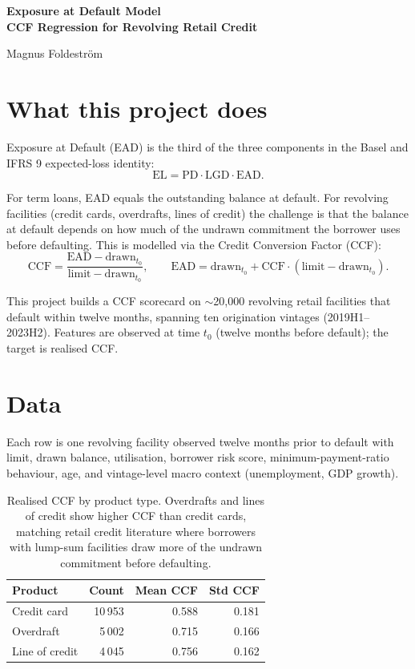 \documentclass[a4paper,11pt]{article}
\begin{document}
\begin{titlepage}
\thispagestyle{empty}
\centering
\vspace*{3cm}
{\Huge\bfseries Exposure at Default Model\\\bigskip
\LARGE CCF Regression for Revolving Retail Credit
\par}
\vspace{1.5cm}
{\Large Magnus Foldeström\par}
\vfill
\end{titlepage}

\section{What this project does}

Exposure at Default (EAD) is the third of the three components in the
Basel and IFRS 9 expected-loss identity:
$$\mathrm{EL} = \mathrm{PD} \cdot \mathrm{LGD} \cdot \mathrm{EAD}.$$

For term loans, EAD equals the outstanding balance at default. For
revolving facilities (credit cards, overdrafts, lines of credit) the
challenge is that the balance at default depends on how much of the
undrawn commitment the borrower uses before defaulting. This is
modelled via the Credit Conversion Factor (CCF):
$$\mathrm{CCF} = \frac{\mathrm{EAD} - \mathrm{drawn}_{t_0}}{\mathrm{limit} - \mathrm{drawn}_{t_0}},
\qquad
\mathrm{EAD} = \mathrm{drawn}_{t_0} + \mathrm{CCF} \cdot (\mathrm{limit} - \mathrm{drawn}_{t_0}).$$

This project builds a CCF scorecard on $\sim$20{,}000 revolving
retail facilities that default within twelve months, spanning ten
origination vintages (2019H1--2023H2). Features are observed at time
$t_0$ (twelve months before default); the target is realised CCF.

\section{Data}

Each row is one revolving facility observed twelve months prior to
default with limit, drawn balance, utilisation, borrower risk score,
minimum-payment-ratio behaviour, age, and vintage-level macro
context (unemployment, GDP growth).

\begin{table}[H]
\centering
\begin{tabular}{l r r r}
\toprule
\textbf{Product} & \textbf{Count} & \textbf{Mean CCF} & \textbf{Std CCF} \\
\midrule
Credit card     & 10\,953 & 0.588 & 0.181 \\
Overdraft       & 5\,002  & 0.715 & 0.166 \\
Line of credit  & 4\,045  & 0.756 & 0.162 \\
\bottomrule
\end{tabular}
\caption{Realised CCF by product type. Overdrafts and lines of credit
show higher CCF than credit cards, matching retail credit literature
where borrowers with lump-sum facilities draw more of the undrawn
commitment before defaulting.}
\end{table}
\end{document}
